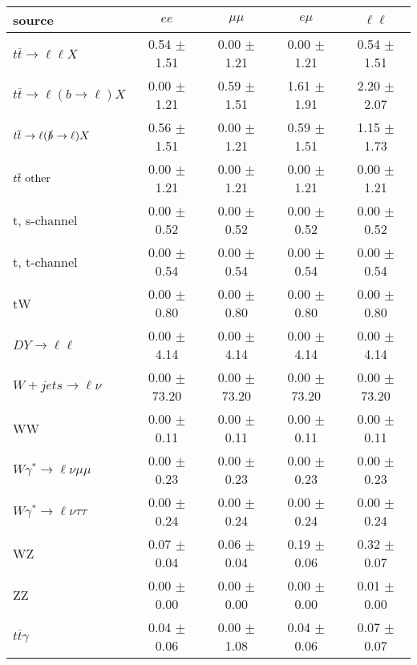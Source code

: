 \begin{tabular}{l|cccc} \hline\hline
source & $ee$ & $\mu\mu$ & $e\mu$ & $\ell\ell $ \\
\hline
$t\overline{t} \rightarrow \ell \ell X$ &  0.54 $\pm$  1.51 &  0.00 $\pm$  1.21 &  0.00 $\pm$  1.21 &  0.54 $\pm$  1.51 \\
$t\overline{t} \rightarrow \ell (b \rightarrow \ell) X$ &  0.00 $\pm$  1.21 &  0.59 $\pm$  1.51 &  1.61 $\pm$  1.91 &  2.20 $\pm$  2.07 \\
$t\overline{t} \rightarrow \ell (\slashed b \rightarrow \ell) X$ &  0.56 $\pm$  1.51 &  0.00 $\pm$  1.21 &  0.59 $\pm$  1.51 &  1.15 $\pm$  1.73 \\
        $t\overline{t}\ \rm{other}$ &  0.00 $\pm$  1.21 &  0.00 $\pm$  1.21 &  0.00 $\pm$  1.21 &  0.00 $\pm$  1.21 \\
\hline
                       t, s-channel &  0.00 $\pm$  0.52 &  0.00 $\pm$  0.52 &  0.00 $\pm$  0.52 &  0.00 $\pm$  0.52 \\
                       t, t-channel &  0.00 $\pm$  0.54 &  0.00 $\pm$  0.54 &  0.00 $\pm$  0.54 &  0.00 $\pm$  0.54 \\
                                 tW &  0.00 $\pm$  0.80 &  0.00 $\pm$  0.80 &  0.00 $\pm$  0.80 &  0.00 $\pm$  0.80 \\
\hline
         $DY \rightarrow \ell \ell$ &  0.00 $\pm$  4.14 &  0.00 $\pm$  4.14 &  0.00 $\pm$  4.14 &  0.00 $\pm$  4.14 \\
      $W+jets \rightarrow \ell \nu$ &  0.00 $\pm$ 73.20 &  0.00 $\pm$ 73.20 &  0.00 $\pm$ 73.20 &  0.00 $\pm$ 73.20 \\
                                 WW &  0.00 $\pm$  0.11 &  0.00 $\pm$  0.11 &  0.00 $\pm$  0.11 &  0.00 $\pm$  0.11 \\
\hline
$W\gamma^{*} \rightarrow \ell \nu \mu\mu$ &  0.00 $\pm$  0.23 &  0.00 $\pm$  0.23 &  0.00 $\pm$  0.23 &  0.00 $\pm$  0.23 \\
$W\gamma^{*} \rightarrow \ell \nu \tau\tau$ &  0.00 $\pm$  0.24 &  0.00 $\pm$  0.24 &  0.00 $\pm$  0.24 &  0.00 $\pm$  0.24 \\
                                 WZ &  0.07 $\pm$  0.04 &  0.06 $\pm$  0.04 &  0.19 $\pm$  0.06 &  0.32 $\pm$  0.07 \\
                                 ZZ &  0.00 $\pm$  0.00 &  0.00 $\pm$  0.00 &  0.00 $\pm$  0.00 &  0.01 $\pm$  0.00 \\
\hline
              $t\overline{t}\gamma$ &  0.04 $\pm$  0.06 &  0.00 $\pm$  1.08 &  0.04 $\pm$  0.06 &  0.07 $\pm$  0.07 \\

\end{tabular}

